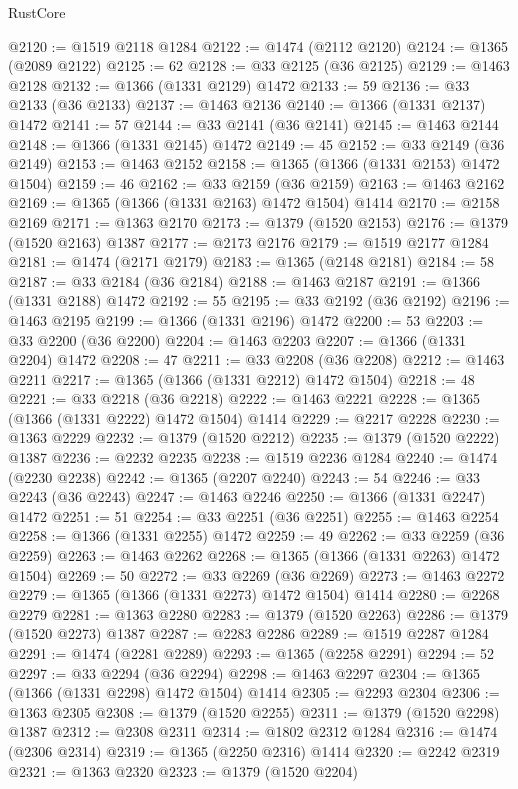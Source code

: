 \begin{lexlean}{RustCore}
\begin{coremodule}
@2120 := @1519 @2118 @1284
@2122 := @1474 (@2112 @2120)
@2124 := @1365 (@2089 @2122)
@2125 := 62
@2128 := @33 @2125 (@36 @2125)
@2129 := @1463 @2128
@2132 := @1366 (@1331 @2129) @1472
@2133 := 59
@2136 := @33 @2133 (@36 @2133)
@2137 := @1463 @2136
@2140 := @1366 (@1331 @2137) @1472
@2141 := 57
@2144 := @33 @2141 (@36 @2141)
@2145 := @1463 @2144
@2148 := @1366 (@1331 @2145) @1472
@2149 := 45
@2152 := @33 @2149 (@36 @2149)
@2153 := @1463 @2152
@2158 := @1365 (@1366 (@1331 @2153) @1472 @1504)
@2159 := 46
@2162 := @33 @2159 (@36 @2159)
@2163 := @1463 @2162
@2169 := @1365 (@1366 (@1331 @2163) @1472 @1504) @1414
@2170 := @2158 @2169
@2171 := @1363 @2170
@2173 := @1379 (@1520 @2153)
@2176 := @1379 (@1520 @2163) @1387
@2177 := @2173 @2176
@2179 := @1519 @2177 @1284
@2181 := @1474 (@2171 @2179)
@2183 := @1365 (@2148 @2181)
@2184 := 58
@2187 := @33 @2184 (@36 @2184)
@2188 := @1463 @2187
@2191 := @1366 (@1331 @2188) @1472
@2192 := 55
@2195 := @33 @2192 (@36 @2192)
@2196 := @1463 @2195
@2199 := @1366 (@1331 @2196) @1472
@2200 := 53
@2203 := @33 @2200 (@36 @2200)
@2204 := @1463 @2203
@2207 := @1366 (@1331 @2204) @1472
@2208 := 47
@2211 := @33 @2208 (@36 @2208)
@2212 := @1463 @2211
@2217 := @1365 (@1366 (@1331 @2212) @1472 @1504)
@2218 := 48
@2221 := @33 @2218 (@36 @2218)
@2222 := @1463 @2221
@2228 := @1365 (@1366 (@1331 @2222) @1472 @1504) @1414
@2229 := @2217 @2228
@2230 := @1363 @2229
@2232 := @1379 (@1520 @2212)
@2235 := @1379 (@1520 @2222) @1387
@2236 := @2232 @2235
@2238 := @1519 @2236 @1284
@2240 := @1474 (@2230 @2238)
@2242 := @1365 (@2207 @2240)
@2243 := 54
@2246 := @33 @2243 (@36 @2243)
@2247 := @1463 @2246
@2250 := @1366 (@1331 @2247) @1472
@2251 := 51
@2254 := @33 @2251 (@36 @2251)
@2255 := @1463 @2254
@2258 := @1366 (@1331 @2255) @1472
@2259 := 49
@2262 := @33 @2259 (@36 @2259)
@2263 := @1463 @2262
@2268 := @1365 (@1366 (@1331 @2263) @1472 @1504)
@2269 := 50
@2272 := @33 @2269 (@36 @2269)
@2273 := @1463 @2272
@2279 := @1365 (@1366 (@1331 @2273) @1472 @1504) @1414
@2280 := @2268 @2279
@2281 := @1363 @2280
@2283 := @1379 (@1520 @2263)
@2286 := @1379 (@1520 @2273) @1387
@2287 := @2283 @2286
@2289 := @1519 @2287 @1284
@2291 := @1474 (@2281 @2289)
@2293 := @1365 (@2258 @2291)
@2294 := 52
@2297 := @33 @2294 (@36 @2294)
@2298 := @1463 @2297
@2304 := @1365 (@1366 (@1331 @2298) @1472 @1504) @1414
@2305 := @2293 @2304
@2306 := @1363 @2305
@2308 := @1379 (@1520 @2255)
@2311 := @1379 (@1520 @2298) @1387
@2312 := @2308 @2311
@2314 := @1802 @2312 @1284
@2316 := @1474 (@2306 @2314)
@2319 := @1365 (@2250 @2316) @1414
@2320 := @2242 @2319
@2321 := @1363 @2320
@2323 := @1379 (@1520 @2204)

\end{coremodule}
\end{lexlean}
